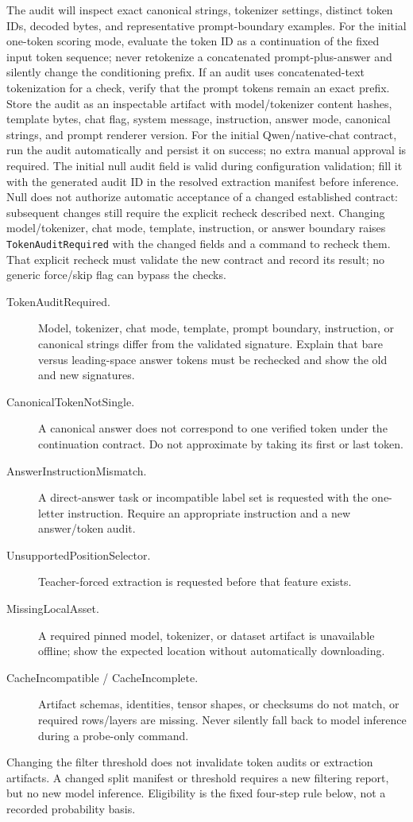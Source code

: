 \documentclass[11pt]{article}
\begin{document}
The audit will inspect exact canonical strings, tokenizer settings, distinct token IDs, decoded bytes, and representative prompt-boundary examples.
For the initial one-token scoring mode, evaluate the token ID as a continuation of the fixed input token sequence; never retokenize a concatenated prompt-plus-answer and silently change the conditioning prefix.
If an audit uses concatenated-text tokenization for a check, verify that the prompt tokens remain an exact prefix.
Store the audit as an inspectable artifact with model/tokenizer content hashes, template bytes, chat flag, system message, instruction, answer mode, canonical strings, and prompt renderer version.
For the initial Qwen/native-chat contract, run the audit automatically and persist it on success; no extra manual approval is required.
The initial null audit field is valid during configuration validation; fill it with the generated audit ID in the resolved extraction manifest before inference.
Null does not authorize automatic acceptance of a changed established contract: subsequent changes still require the explicit recheck described next.
Changing model/tokenizer, chat mode, template, instruction, or answer boundary raises \texttt{TokenAuditRequired} with the changed fields and a command to recheck them.
That explicit recheck must validate the new contract and record its result; no generic force/skip flag can bypass the checks.

\begin{description}
\item[TokenAuditRequired.] Model, tokenizer, chat mode, template, prompt boundary, instruction, or canonical strings differ from the validated signature.
Explain that bare versus leading-space answer tokens must be rechecked and show the old and new signatures.
\item[CanonicalTokenNotSingle.] A canonical answer does not correspond to one verified token under the continuation contract.
Do not approximate by taking its first or last token.
\item[AnswerInstructionMismatch.] A direct-answer task or incompatible label set is requested with the one-letter instruction.
Require an appropriate instruction and a new answer/token audit.
\item[UnsupportedPositionSelector.] Teacher-forced extraction is requested before that feature exists.
\item[MissingLocalAsset.] A required pinned model, tokenizer, or dataset artifact is unavailable offline; show the expected location without automatically downloading.
\item[CacheIncompatible / CacheIncomplete.] Artifact schemas, identities, tensor shapes, or checksums do not match, or required rows/layers are missing.
Never silently fall back to model inference during a probe-only command.
\end{description}
Changing the filter threshold does not invalidate token audits or extraction artifacts.
A changed split manifest or threshold requires a new filtering report, but no new model inference.
Eligibility is the fixed four-step rule below, not a recorded probability basis.
\end{document}
